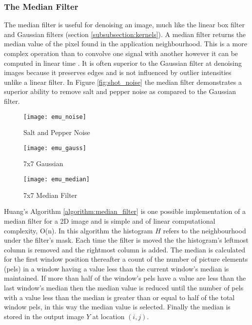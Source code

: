 
\subsubsection{The Median Filter}
\label{subsubsection:median_filter}

The median filter is useful for denoising an image, much like the linear box filter and Gaussian filters (section \ref{subsubsection:kernels}). A median filter returns the median value of the pixel found in the application neighbourhood. This is a more complex operation than to convolve one signal with another however it can be computed in linear time \cite{cormen_2001}. It is often superior to the Gaussian filter at denoising images because it preserves edges and is not influenced by outlier intensities unlike a linear filter. In Figure \ref{fig:shot_noise} the median filter demonstrates a superior ability to remove salt and pepper noise as compared to the Gaussian filter.

\begin{figure*}[htbp]
    \centering 
    \begin{subfigure}[b]{0.3\textwidth}
        \texttt{[image: emu\_noise]}
        \caption{Salt and Pepper Noise}
        \label{fig:emu_noise}
    \end{subfigure}
    \begin{subfigure}[b]{0.3\textwidth}
        \texttt{[image: emu\_gauss]}
        \caption{7x7 Gaussian}
        \label{fig:emu_gauss}
    \end{subfigure}
    \begin{subfigure}[b]{0.3\textwidth}
        \texttt{[image: emu\_median]}
        \caption{7x7 Median Filter}
        \label{fig:emu_median}
    \end{subfigure}
    \captionsetup{format=hang}
    \caption{Filtering out salt and pepper noise with Gaussian and median filter. Original image by Grant Durr.}
    \label{fig:shot_noise}
\end{figure*}

Huang's Algorithm \ref{algorithm:median_filter} is one possible implementation \cite{median_filter_new}\cite{median_filter_3} of a median filter for a 2D image and is simple and of linear computational complexity, O(n). In this algorithm the histogram $H$ refers to the neighbourhood under the filter's mask. Each time the filter is moved the the histogram's leftmost column is removed and the rightmost column is added. The median is calculated for the first window position thereafter a count of the number of picture elements (pels) in a window having a value less than the current window's median is maintained. If more than half of the window's pels have a value are less than the last window's median then the median value is reduced until the number of pels with a value less than the median is greater than or equal to half of the total window pels, in this way the median value is selected. Finally the median is stored in the output image $Y$ at location $(i,j)$. 

